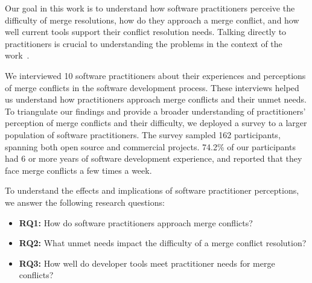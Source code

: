 Our goal in this work is to understand how software practitioners perceive the difficulty of merge resolutions, how do they approach a merge conflict, and how well current tools support their conflict resolution needs.
Talking directly to practitioners is crucial to understanding the problems in the context of the work~\cite{fritz2010using, sillito2006questions, de2008answering, ko2007information}.

We interviewed 10 software practitioners about their experiences and perceptions of merge conflicts in the software development process. These interviews helped us understand how practitioners approach merge conflicts and their unmet needs.
To triangulate our findings and provide a broader understanding of practitioners' perception of merge conflicts and their difficulty, we deployed a survey to a larger population of software practitioners.
The survey sampled 162 participants, spanning both open source and commercial projects. 74.2\% of our participants had 6 or more years of software development experience, and reported that they face merge conflicts a few times a week.

To understand the effects and implications of software practitioner perceptions, we answer the following research questions:

\begin{itemize}
\item \textbf{RQ1:} How do software practitioners approach merge conflicts?
\item \textbf{RQ2:} What unmet needs impact the difficulty of a merge conflict resolution?
\item \textbf{RQ3:} How well do developer tools meet practitioner needs for merge conflicts?
\end{itemize}

